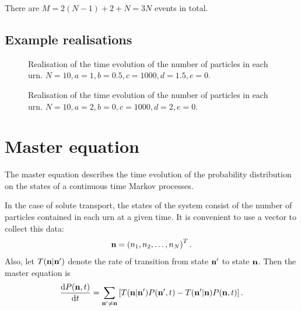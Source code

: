 There are \(M=2(N-1) + 2 + N = 3N\) events in total.

\FloatBarrier

\subsection{Example realisations}

\begin{figure}[ht!]
    \centering
    {
    }

    \caption{\label{fig:exreal1}Realisation of the time evolution of the number
of particles in each urn. \(N=10,a=1,b=0.5,c=1000,d=1.5,e=0\).}
\end{figure}

\begin{figure}[ht!]
    \centering
    {
    }

    \caption{\label{fig:exreal2}Realisation of the time evolution of the number
of particles in each urn. \(N=10,a=2,b=0,c=1000,d=2,e=0\).}
\end{figure}

\FloatBarrier

\section{Master equation}
The master equation describes the time evolution of the probability distribution
on the states of a continuous time Markov processes.

%

In the case of solute transport, the states of the system consist of the number
of particles contained in each urn at a given time. It is convenient to use a
vector to collect this data:
\begin{equation}
    \label{eqn:state_vector}
    \mathbf{n} = \left(n_1,n_2, \dotsc, n_N\right)^{T}.
\end{equation}
Also, let \(T(\mathbf{n}|\mathbf{n}')\) denote the rate of transition from state \(\mathbf{n}'\)
to state \(\mathbf{n}\). Then the master equation is \citep{mckane2012stochastic}
\begin{equation}
    \label{eqn:master_eqn_rates}
    \frac{\mathrm{d} P(\mathbf{n},t)}{\mathrm{d} t} = \sum_{\mathbf{n}' \neq \mathbf{n}} \left[ T(\mathbf{n}|\mathbf{n}')
        P(\mathbf{n}',t) - T(\mathbf{n}'|\mathbf{n}) P(\mathbf{n},t) \right].
\end{equation}

